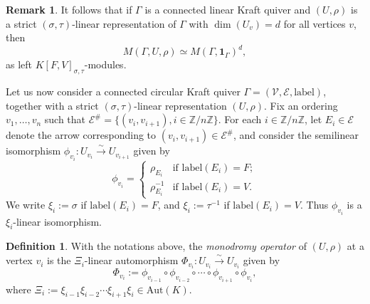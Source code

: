 \documentclass[12pt]{amsart}
\theoremstyle{definition}
\newtheorem{definition}[theorem]{Definition}
\newtheorem{remark}[theorem]{Remark}
\newcommand{\<}{\langle}   %
\renewcommand{\>}{\rangle} %
\begin{document}
\begin{remark}
    It follows that if $\Gamma$ is a connected linear Kraft quiver and $(U,\rho)$ is a strict $(\sigma,\tau)$-linear representation of $\Gamma$ with $\dim(U_v) = d$ for all vertices $v$, then 
    \begin{equation*}
        M(\Gamma,U,\rho) \simeq M(\Gamma,\mathbf 1_{\Gamma})^{d},
    \end{equation*}
    as left $K[F,V]_{\sigma,\tau}$-modules.
\end{remark}

Let us now consider a connected circular Kraft quiver $\Gamma = (\mathcal V,\mathcal E,\mathrm{label})$, together with a strict $(\sigma,\tau)$-linear representation $(U,\rho)$. Fix an ordering $v_1,\ldots , v_n$ such that $\mathcal E^{\#} = \{(v_i,v_{i+1}), i \in \mathbb Z/n\mathbb Z\}$. For each $i \in \mathbb Z/n\mathbb Z$, let $E_i \in \mathcal E$ denote the arrow corresponding to $(v_i,v_{i+1}) \in \mathcal E^{\#}$, and consider the semilinear isomorphism $\phi_{v_i}: U_{v_i} \xrightarrow{\sim} U_{v_{i+1}}$ given by 
\begin{equation*}
    \phi_{v_i} = \begin{cases}
        \rho_{E_i} & \text{if } \mathrm{label}(E_i) = F;\\
        \rho_{E_i}^{-1} & \text{if } \mathrm{label}(E_i) = V.
    \end{cases}
\end{equation*}
We write $\xi_i := \sigma$ if $\mathrm{label}(E_i) = F$, and $\xi_i := \tau^{-1}$ if $\mathrm{label}(E_i) = V$. Thus $\phi_{v_i}$ is a $\xi_i$-linear isomorphism.

\begin{definition}\label{DefinitionMonodromy}
    With the notations above, the \textit{monodromy operator} of $(U,\rho)$ at a vertex $v_i$ is the $\Xi_i$-linear automorphism $\Phi_{v_i}:U_{v_i}\xrightarrow{\sim} U_{v_i}$ given by
    \begin{equation*}
        \Phi_{v_i} := \phi_{v_{i-1}} \circ \phi_{v_{i-2}} \circ \cdots \circ \phi_{v_{i+1}} \circ \phi_{v_i},
    \end{equation*}
    where $\Xi_i := \xi_{i-1}\xi_{i-2}\cdots \xi_{i+1}\xi_{i} \in \mathrm{Aut}(K)$.
\end{definition}
\end{document}
